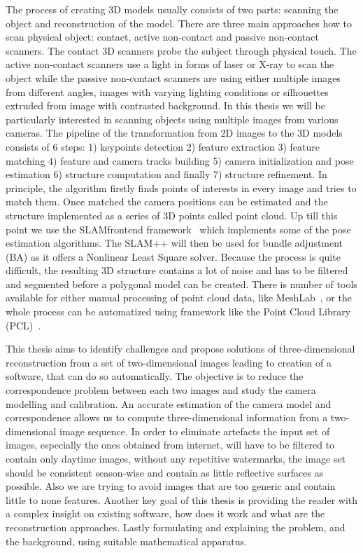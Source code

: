 The process of creating 3D models usually consists of two parts: scanning the object and reconstruction of the model. There are three main approaches how to scan physical object: contact, active non-contact  and passive non-contact scanners. The contact 3D scanners probe the subject through physical touch. The active non-contact scanners use a light in forms of laser or X-ray to scan the object while the passive non-contact scanners are using either multiple images from different angles, images with varying lighting conditions or silhouettes extruded from image with contrasted background. In this thesis we will be particularly interested in scanning objects using multiple images from various cameras. The pipeline of the transformation from 2D images to the 3D models consists of 6 steps: 1) keypoints detection 2) feature extraction  3) feature matching 4) feature and camera tracks building 5) camera initialization and pose estimation 6) structure computation and finally 7) structure refinement. In principle, the algorithm firstly finds points of interests in every image and tries to match them. Once matched the camera positions can be estimated and the structure implemented as a series of 3D points called point cloud. Up till this point we use the SLAM\textunderscore frontend framework~\cite{www:slam_frontend} which implements some of the pose estimation algorithms. The SLAM++ will then be used for bundle adjustment (BA) as it offers a Nonlinear Least Square solver. Because the process is quite difficult, the resulting 3D structure contains a lot of noise and has to be filtered and segmented before a polygonal model can be created. There is number of tools available for either manual processing of point cloud data, like MeshLab~\cite{www:MeshLab}, or the whole process can be automatized using framework like the Point Cloud Library (PCL)~\cite{www:pcl}.

This thesis aims to identify challenges and propose solutions of three-dimensional reconstruction from a set of two-dimensional images leading to creation of a software, that can do so automatically. The objective is to reduce the correspondence problem between each two images and study the camera modelling and calibration. An accurate estimation of the camera model and correspondence allows us to compute three-dimensional information from a two-dimensional image sequence. In order to eliminate artefacts the input set of images, especially the ones obtained from internet, will have to be filtered to contain only daytime images, without any repetitive watermarks, the image set should be consistent season-wise and contain as little reflective surfaces as possible. Also we are trying to avoid images that are too generic and contain little to none features. Another key goal of this thesis is providing the reader with a complex insight on existing software, how does it work and what are the reconstruction approaches. Lastly formulating and explaining the problem, and the background, using suitable mathematical apparatus.

